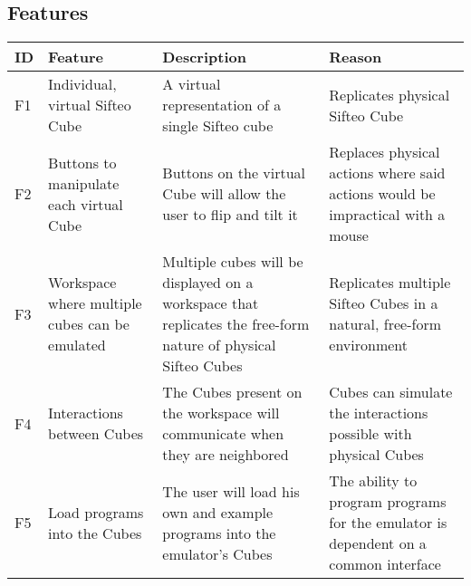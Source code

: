 \documentclass[12pt]{article}
\begin{document}
    \begin{landscape}
    \section{Features}
    \begin{table}[h]
      \begin{tabular}{p{.5in} | p{2.25in} | p{2.75in} | p{3in}}
        \textbf{ID} &
        \textbf{Feature} &
        \textbf{Description} &
        \textbf{Reason} 
        \\ \hline

        F1 &
        Individual, virtual Sifteo Cube &
        A virtual representation of a single Sifteo cube &
        Replicates physical Sifteo Cube
        \\ \hline

        F2 &
        Buttons to manipulate each virtual Cube &
        Buttons on the virtual Cube will allow the user to flip and tilt it &
        Replaces physical actions where said actions would be impractical with a mouse
        \\ \hline

        F3 &
        Workspace where multiple cubes can be emulated &
        Multiple cubes will be displayed on a workspace that replicates the free-form nature of physical Sifteo Cubes\index{Sifteo Cubes} &
        Replicates multiple Sifteo Cubes\index{Sifteo Cubes} in a natural, free-form environment
        \\ \hline

        F4 &
        Interactions between Cubes &
        The Cubes present on the workspace will communicate when they are neighbored &
        Cubes can simulate the interactions possible with physical Cubes
        \\ \hline

        F5 &
        Load programs into the Cubes &
        The user will load his own and example programs into the emulator’s\index{emulator} Cubes &
        The ability to program programs for the emulator\index{emulator} is dependent on a common interface
        \\ \hline


\end{tabular}
\end{table}
\end{landscape}
\end{document}
